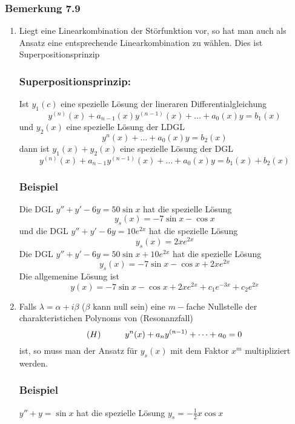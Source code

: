 \subsubsection*{Bemerkung 7.9}
\begin{enumerate}
\item {}Liegt eine Linearkombination der Störfunktion vor, so hat man auch als Ansatz eine entsprechende Linearkombination zu wählen. Dies ist Superpositionsprinzip
\subsubsection*{Superpositionsprinzip:}
Ist $y_1(c)$ eine spezielle Lösung der lineraren Differentialgleichung \[y^{(n)}(x)+a_{n-1}(x)y^{(n-1)}(x)+\dots +a_0(x)y=b_1(x)\] und $y_2(x)$ eine spezielle Lösung der LDGL \[y^n(x)+\dots +a_0(x)y=b_2(x)\] dann ist $y_1(x)+y_2(x)$ eine spezielle Lösung der DGL \[y^{(n)}(x)+a_{n-1}y^{(n-1)}(x)+\dots+a_0(x)y=b_1(x)+b_2(x)\]
\subsubsection*{Beispiel}
Die DGL $y''+y'-6y=50\sin x$ hat die spezielle Lösung \[y_s(x)=-7\sin x-\cos x\] und die DGL $y''+y'-6y=10e^{2x}$ hat die spezielle Lösung \[y_s(x)=2xe^{2x}\]Die DGL $y''+y'-6y=50\sin x+10e^{2x}$ hat die spezielle Lösung \[y_s(x)=-7\sin x-\cos x+2xe^{2x}\] Die allgemenine Lösung ist \[y(x)=-7\sin x -\cos x+2xe^{2x}+c_1e^{-3x}+c_2e^{2x}\]
\item Falls $\lambda=\alpha +i\beta$ ($\beta$ kann null sein) eine $m-$fache Nullstelle der charakteristichen Polynoms von (Resonanzfall) \[(H)\hspace{10mm}y^n(x)+a_ny^{(n-1)}+\dots +a_0=0\]ist, so muss man der Ansatz für $y_s(x)$ mit dem Faktor $x^m$ multipliziert werden.
\subsubsection*{Beispiel}
$y''+y=\sin x$ hat die spezielle Lösung $y_s=-\frac{1}{2}x\cos x$



\begin{figure}[ht]
\begin{minipage}[b]{0.45\linewidth}
\begin{center}
\end{center}
\end{minipage}
\hspace{0.5cm}
\begin{minipage}[b]{0.45\linewidth}


\end{minipage}
\end{figure}
\end{enumerate}
